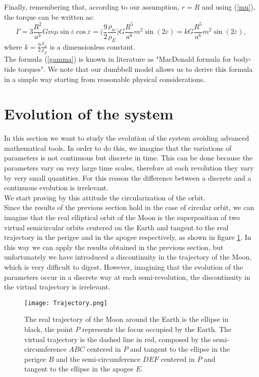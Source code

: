 \documentclass[11pt, oneside,reqno]{amsart}
\begin{document}
Finally, remembering that, according to our assumption, $r=R$ and using (\ref{mu}), the torque can be written as:
\begin{equation}
	\label{gamma}
	\Gamma=3\frac{R^2}{a^3}Gm \mu \sin\varepsilon \cos\varepsilon = \biggl( \frac{9}{2} \frac{\rho_w}{\rho_E}\biggr) G \frac{R^5}{a^6} m^2 \sin(2\varepsilon) = k G \frac{R^5}{a^6} m^2 \sin(2\varepsilon),
\end{equation}
where $k = \frac{9}{2} \frac{\rho_w}{\rho_E}$ is a dimensionless constant.\\
The formula (\ref{gamma}) is known in literature as "MacDonald formula for body-tide torques".
We note that our dumbbell model allows us to derive this formula in a simple way starting from reasonable physical considerations.\\



\section{Evolution of the system}
\label{section_evolution}
In this section we want to study the evolution of the system avoiding advanced mathematical tools. In order to do this, we imagine that the variations of parameters is not continuous but discrete in time. This can be done because the parameters vary on very large time scales, therefore at each revolution they vary by very small quantities. For this reason the difference between a discrete and a continuous evolution is irrelevant.\\
We start proving by this attitude the circularization of the orbit.\\
Since the results of the previous section hold in the case of circular orbit, we can imagine that the real elliptical orbit of the Moon is the superposition of two virtual semicircular orbits centered on the Earth and tangent to the real trajectory in the perigee and in the apogee respectively, as shown in figure \ref{fig_trajectory}. In this way we can apply the results obtained in the previous section, but unfortunately we have introduced a discontinuity in the trajectory of the Moon, which is very difficult to digest. However, imagining that the evolution of the parameters occur in a discrete way at each semi-revolution, the discontinuity in the virtual trajectory is irrelevant.\\
\begin{figure}
	\centering
	\texttt{[image: Trajectory.png]}
	\caption{The real trajectory of the Moon around the Earth is the ellipse in black, the point $P$ represents the focus occupied by the Earth. The virtual trajectory is the dashed line in red, composed by the semi-circumference $ABC$ centered in $P$ and tangent to the ellipse in the perigee $B$ and the semi-circumference $DEF$ centered in $P$ and tangent to the ellipse in the apogee $E$.}
	\label{fig_trajectory}
\end{figure}
\end{document}
